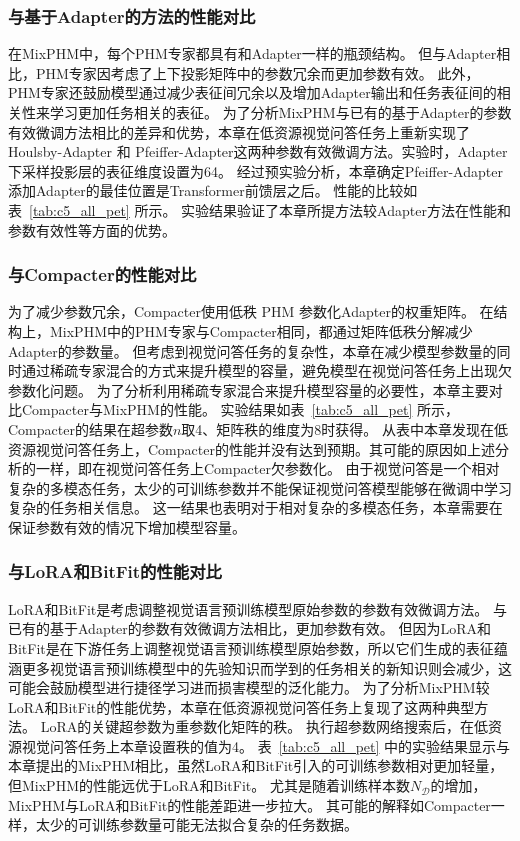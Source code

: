 


\subsubsection{与基于Adapter的方法的性能对比}
在MixPHM中，每个PHM专家都具有和Adapter一样的瓶颈结构。
但与Adapter相比，PHM专家因考虑了上下投影矩阵中的参数冗余而更加参数有效。
此外，PHM专家还鼓励模型通过减少表征间冗余以及增加Adapter输出和任务表征间的相关性来学习更加任务相关的表征。
为了分析MixPHM与已有的基于Adapter的参数有效微调方法相比的差异和优势，本章在低资源视觉问答任务上重新实现了Houlsby-Adapter 和 Pfeiffer-Adapter这两种参数有效微调方法。实验时，Adapter下采样投影层的表征维度设置为64。
经过预实验分析，本章确定Pfeiffer-Adapter添加Adapter的最佳位置是Transformer前馈层之后。
性能的比较如表~\ref{tab:c5_all_pet} 所示。
实验结果验证了本章所提方法较Adapter方法在性能和参数有效性等方面的优势。


\subsubsection{与Compacter的性能对比}
为了减少参数冗余，Compacter使用低秩 PHM 参数化Adapter的权重矩阵。
在结构上，MixPHM中的PHM专家与Compacter相同，都通过矩阵低秩分解减少Adapter的参数量。
但考虑到视觉问答任务的复杂性，本章在减少模型参数量的同时通过稀疏专家混合的方式来提升模型的容量，避免模型在视觉问答任务上出现欠参数化问题。
为了分析利用稀疏专家混合来提升模型容量的必要性，本章主要对比Compacter与MixPHM的性能。
实验结果如表~\ref{tab:c5_all_pet} 所示，Compacter的结果在超参数$n$取4、矩阵秩的维度为8时获得。
从表中本章发现在低资源视觉问答任务上，Compacter的性能并没有达到预期。其可能的原因如上述分析的一样，即在视觉问答任务上Compacter欠参数化。
由于视觉问答是一个相对复杂的多模态任务，太少的可训练参数并不能保证视觉问答模型能够在微调中学习复杂的任务相关信息。
这一结果也表明对于相对复杂的多模态任务，本章需要在保证参数有效的情况下增加模型容量。


\subsubsection{与LoRA和BitFit的性能对比}
LoRA和BitFit是考虑调整视觉语言预训练模型原始参数的参数有效微调方法。
与已有的基于Adapter的参数有效微调方法相比，更加参数有效。
但因为LoRA和BitFit是在下游任务上调整视觉语言预训练模型原始参数，所以它们生成的表征蕴涵更多视觉语言预训练模型中的先验知识而学到的任务相关的新知识则会减少，这可能会鼓励模型进行捷径学习进而损害模型的泛化能力。
为了分析MixPHM较LoRA和BitFit的性能优势，本章在低资源视觉问答任务上复现了这两种典型方法。
LoRA的关键超参数为重参数化矩阵的秩。
执行超参数网络搜索后，在低资源视觉问答任务上本章设置秩的值为4。
表~\ref{tab:c5_all_pet} 中的实验结果显示与本章提出的MixPHM相比，虽然LoRA和BitFit引入的可训练参数相对更加轻量，但MixPHM的性能远优于LoRA和BitFit。
尤其是随着训练样本数$N_{\mathcal{D}}$的增加，MixPHM与LoRA和BitFit的性能差距进一步拉大。
其可能的解释如Compacter一样，太少的可训练参数量可能无法拟合复杂的任务数据。



